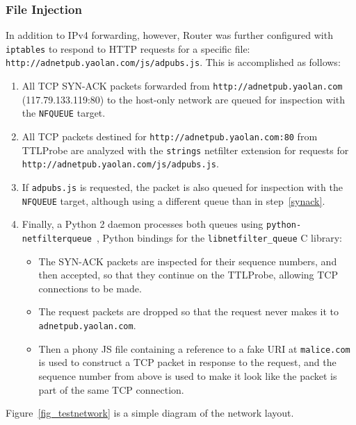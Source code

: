 \subsubsection{File Injection}
In addition to IPv4 forwarding, however, Router was further configured with \texttt{iptables} to respond to HTTP requests for a specific file: \texttt{http://adnetpub.yaolan.com/js/adpubs.js}.
This is accomplished as follows:
\begin{enumerate}\addtolength{\itemsep}{-.35\baselineskip}
	\item\label{synack} All TCP SYN-ACK packets forwarded from \texttt{http://adnetpub.yaolan.com} (117.79.133.119:80) to the host-only network are queued for inspection with the \texttt{NFQUEUE} target.
	\item All TCP packets destined for \texttt{http://adnetpub.yaolan.com:80} from TTLProbe are analyzed with the \texttt{strings} netfilter extension for requests for \texttt{http://adnetpub.yaolan.com/js/\allowbreak{}adpubs.js}.
	\item If \texttt{adpubs.js} is requested, the packet is also queued for inspection with the \texttt{NFQUEUE} target, although using a different queue than in step~\ref{synack}.
	\item Finally, a Python 2 daemon processes both queues using \texttt{python-netfilterqueue}~\cite{Kerkhoff2015}, Python bindings for the \texttt{libnetfilter\_queue} C library:
	\begin{itemize}
		\item The SYN-ACK packets are inspected for their sequence numbers, and then accepted, so that they continue on the TTLProbe, allowing TCP connections to be made.
		\item The request packets are dropped so that the request never makes it to \texttt{adnetpub.yaolan.com}.
		\item Then a phony JS file containing a reference to a fake URI at \texttt{malice.com} is used to construct a TCP packet in response to the request, and the sequence number from above is used to make it look like the packet is part of the same TCP connection.
	\end{itemize}
\end{enumerate}
Figure~\ref{fig_testnetwork} is a simple diagram of the network layout.
